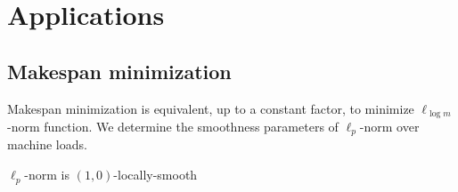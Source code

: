 
\section{Applications}

\subsection{Makespan minimization}


Makespan minimization is equivalent, up to a constant factor, to minimize $\ell_{\log m}$-norm function.
We determine the smoothness parameters of $\ell_{p}$-norm over machine loads.

\begin{lemma}
$\ell_{p}$-norm is $(1,0)$-locally-smooth
\end{lemma}
%
